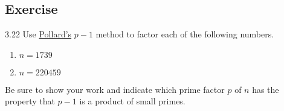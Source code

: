\renewcommand{\theenumi}{\alph{enumi}}
\renewcommand{\labelenumi}{(\theenumi)}
\subsection{Exercise}

\begin{exercise}
    {3.22} Use \hyperref[ex:3.10]{Pollard's} \(p - 1\) method to factor each of the following numbers.
    \begin{enumerate}
        \item \(n = 1739\)
        \item \(n = 220459\)
    \end{enumerate}
    Be sure to show your work and indicate which prime factor \(p\) of \(n\) has the property that \(p - 1\) is a product of small primes.
\end{exercise}

